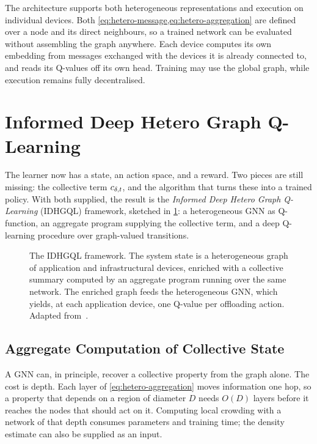 The architecture supports both heterogeneous representations and execution on individual devices.
%
Both \cref{eq:hetero-message,eq:hetero-aggregation} are defined over a node and its direct neighbours,
so a trained network can be evaluated without assembling the graph anywhere.
%
Each device computes its own embedding from messages exchanged with the devices it is already connected to,
and reads its Q-values off its own head.
%
Training may use the global graph, while execution remains fully decentralised.

\section{Informed Deep Hetero Graph Q-Learning}
\label{sec:idhgql}

The learner now has a state, an action space, and a reward.
%
Two pieces are still missing:
the collective term $c_{\delta,t}$, and the algorithm that turns these into a trained policy.
%
With both supplied, the result is the \emph{Informed Deep Hetero Graph Q-Learning} (IDHGQL) framework,
sketched in \cref{fig:idhgql-overview}:
a heterogeneous \ac{GNN} as Q-function,
an aggregate program supplying the collective term,
and a deep Q-learning procedure over graph-valued transitions.

\begin{figure}[tbp]
    \centering
    \def\svgwidth{\textwidth}\scriptsize
    
    \caption[The IDHGQL framework]{The IDHGQL framework. The system state is a heterogeneous graph of application and infrastructural devices, enriched with a collective summary computed by an aggregate program running over the same network. The enriched graph feeds the heterogeneous \ac{GNN}, which yields, at each application device, one Q-value per offloading action. Adapted from~\cite{Farabegoli:2026:HeteroGNN}.}
    \label{fig:idhgql-overview}
\end{figure}

\subsection{Aggregate Computation of Collective State}
\label{subsec:collective-information}

A \ac{GNN} can, in principle, recover a collective property from the graph alone.
%
The cost is depth.
%
Each layer of \cref{eq:hetero-aggregation} moves information one hop,
so a property that depends on a region of diameter $D$ needs $O(D)$ layers before it reaches the nodes that should act on it.
%
Computing local crowding with a network of that depth consumes parameters and training time;
the density estimate can also be supplied as an input.

